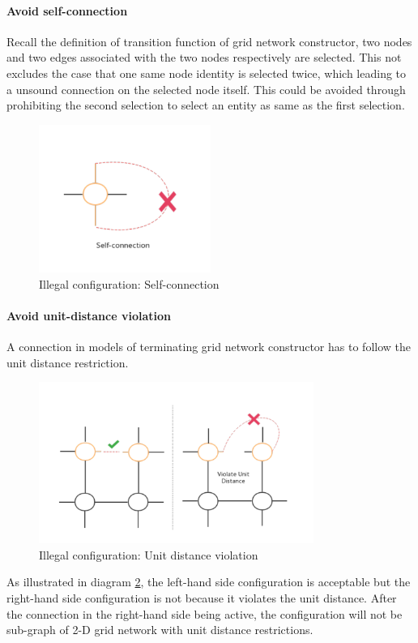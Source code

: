 \paragraph{Avoid self-connection}\noindent
Recall the definition of transition function of grid network constructor, two nodes and two edges associated with the two nodes respectively are selected.
This not excludes the case that one same node identity is selected twice, which leading to a
unsound connection on the selected node itself. This could be avoided through prohibiting the second selection to select an entity as same as the first selection.
\begin{figure}[H]
\begin{center}
\includegraphics[width = 0.5\textwidth]{context/diagram/self-connection.pdf}
\caption{Illegal configuration: Self-connection}
\label{selfcon}
\end{center}
\end{figure}

\par\noindent
\paragraph{Avoid unit-distance violation}\noindent
A connection in models of terminating grid network constructor has to follow the unit distance restriction.
\begin{figure}[H]
\begin{center}
\includegraphics[width = 0.8\textwidth]{context/diagram/unitDistanceViolation.pdf}
\caption{Illegal configuration: Unit distance violation}
\label{unitvio}
\end{center}
\end{figure}
\par\noindent
As illustrated in diagram \ref{unitvio}, the left-hand side configuration is acceptable but the right-hand side configuration is not because
it violates the unit distance. After the connection in the right-hand side being active, the configuration will not be sub-graph of 2-D grid network
with unit distance restrictions.

